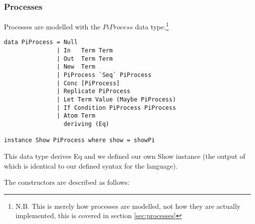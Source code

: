 \subsubsection{Processes}

Processes are modelled with the $PiProcess$ data type.\footnote{N.B. This is merely how processes are modelled, not how they are actually implemented, this is covered in section \ref{sec:processes}}

\begin{verbatim}
data PiProcess = Null
               | In   Term Term
               | Out  Term Term
               | New  Term
               | PiProcess `Seq` PiProcess 
               | Conc [PiProcess]          
               | Replicate PiProcess       
               | Let Term Value (Maybe PiProcess)
               | If Condition PiProcess PiProcess
               | Atom Term
                 deriving (Eq)

instance Show PiProcess where show = showPi
\end{verbatim}
This data type derives Eq and we defined our own Show instance (the output of which is identical to our defined syntax for the language). 

The constructors are described as follows:

